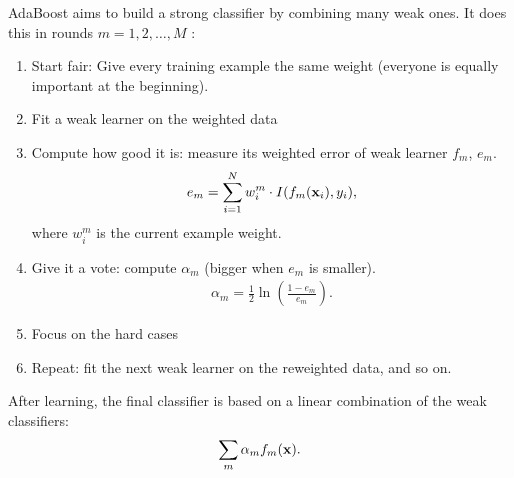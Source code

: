 AdaBoost aims to build a strong classifier by combining many weak ones. It does this in rounds $m=1,2,\dots,M$ :

\begin{enumerate}
	\item Start fair: Give every training example the same weight (everyone is equally important at the beginning).
	\item Fit a weak learner on the weighted data
	\item Compute how good it is: measure its weighted error of weak learner $f_m$, $e_m$. 
		\begin{align*}
			e_m = \sum_{i=1}^{N}w_i^m \cdot I(f_m({\mathbf{x}}_i), y_i),
		\end{align*}
		where $w_i^m$ is the current example weight. 
	\item Give it a vote: compute $\alpha_m$ (bigger when $e_m$ is smaller). 
		\begin{align*}
			\alpha_m = \frac{1}{2}\ln \left(\frac{1-e_m}{e_m}\right).
		\end{align*}
	\item Focus on the hard cases
	\item Repeat: fit the next weak learner on the reweighted data, and so on.
\end{enumerate}

After learning, the final classifier is based on a linear combination of the weak classifiers:
\begin{align*}
	\sum_m \alpha_mf_m({\mathbf{x}}).
\end{align*}





